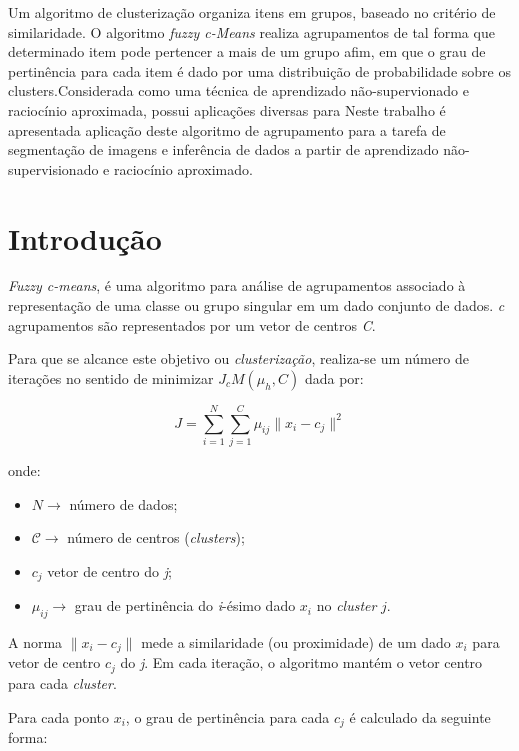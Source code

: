 \documentclass[12pt,a4paper]{article}
\numberwithin{equation}{section}
\begin{document}
{\abstract
Um algoritmo de clusterização organiza itens em grupos,  baseado no critério de similaridade. O algoritmo \textit{fuzzy c-Means} realiza agrupamentos de tal forma que determinado item pode pertencer a mais de um grupo afim, em que o grau de pertinência para cada item é dado por uma distribuição de probabilidade sobre os clusters.Considerada como uma técnica de aprendizado não-supervionado e raciocínio aproximada, possui aplicações diversas para  Neste trabalho é apresentada aplicação deste algoritmo de agrupamento para a tarefa de segmentação de imagens e inferência de dados a partir de aprendizado não-supervisionado e raciocínio aproximado. 
\newpage

\section{Introdução}

\textit{Fuzzy c-means}, é uma algoritmo para análise de agrupamentos associado à representação de uma classe ou grupo singular em um dado conjunto de dados. \textit{c} agrupamentos são representados por um vetor de centros \textit{C}.

Para que se alcance este objetivo ou \textit{clusterização}, realiza-se um número de iterações no sentido de minimizar $J_{c}M(\mu_{h},C)$ dada por:

\begin{equation}
J=\sum_{i=1}^{N}\sum_{j=1}^{C}\mu_{ij}\lVert x_{i}-c_{j} \rVert^2
\end{equation}

onde:
\begin{itemize}
	\item $N\longrightarrow$ número de dados;
	\item $\mathcal{C}\longrightarrow$ número de centros (\textit{clusters});
	\item $c_{j}$ vetor de centro do \textit{j};
	\item $\mu_{ij}\longrightarrow$ grau de pertinência do \textit{i}-ésimo dado $x_{i}$ no \textit{cluster} $j$.
\end{itemize}

A norma $\lVert x_{i}-c_{j} \rVert$ mede a similaridade (ou proximidade) de um dado $x_{i}$ para vetor de centro $c_{j}$ do \textit{j}. Em cada iteração, o algoritmo mantém o vetor centro para cada \textit{cluster}. 

Para cada ponto $x_{i}$, o grau de pertinência para cada $c_{j}$ é calculado da seguinte forma:

}
\end{document}
